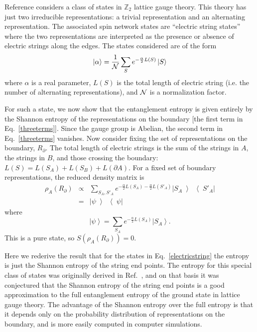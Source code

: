 \documentclass[aps,prd,twocolumn,showpacs,groupedaddress,nofootinbib,letterpaper]{revtex4}
\newcommand{\ket}[1]{\left\vert#1\right\rangle}
\newcommand{\ketbra}[2]{\left|#1\middle\rangle \! \middle\langle#2\right|}
\begin{document}
Reference \cite{Buividovich2008b} considers a class of states in ${\mathbb Z}_2$ lattice gauge theory.
This theory has just two irreducible representations: a trivial representation and an alternating representation.
The associated spin network states are ``electric string states'' where the two representations are interpreted as the presence or absence of electric strings along the edges.
The states considered are of the form
\begin{equation} \label{electricstring}
\ket{\alpha} = \frac{1}{\cal N}\sum_S e^{-\frac{\alpha}{2} L(S)} \ket{S}
\end{equation}
where $\alpha$ is a real parameter, $L(S)$ is the total length of electric string (i.e. the number of alternating representations), and $\cal N$ is a normalization factor.

For such a state, we now show that the entanglement entropy is given entirely by the Shannon entropy of the representations on the boundary [the first term in Eq.~\eqref{threeterms}].
Since the gauge group is Abelian, the second term in Eq.~\eqref{threeterms} vanishes.
Now consider fixing the set of representations on the boundary, $R_{\partial}$.
The total length of electric strings is the sum of the strings in $A$, the strings in $B$, and those crossing the boundary: $L(S) = L(S_A) + L(S_B) + L(\partial A)$.
For a fixed set of boundary representations, the reduced density matrix is
\begin{eqnarray}
\rho_A(R_{\partial}) &\propto& \sum_{S_A, S'_A} e^{-\frac{\alpha}{2} L(S_A) -\frac{\alpha}{2} L(S'_A)} \ketbra{S_A}{S'_A} \\
&=& \ketbra{\psi}{\psi}
\end{eqnarray}
where 
\begin{equation}
\ket{\psi} = \sum_{S_A} e^{-\frac{\alpha}{2} L(S_A)} \ket{S_A}.
\end{equation}
This is a pure state, so $S(\rho_A(R_{\partial})) = 0$.

Here we rederive the result that for the states in Eq.~\eqref{electricstring} the entropy is just the Shannon entropy of the string end points.
The entropy for this special class of states was originally derived in Ref.~\cite{Buividovich2008b}, and on that basis it was conjectured that the Shannon entropy of the string end points is a good approximation to the full entanglement entropy of the ground state in lattice gauge theory.
The advantage of the Shannon entropy over the full entropy is that it depends only on the probability distribution of representations on the boundary, and is more easily computed in computer simulations.
\end{document}
